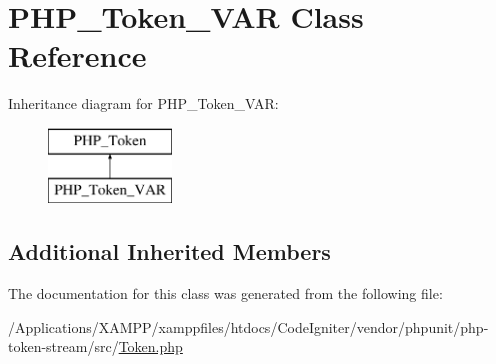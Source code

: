 \hypertarget{class_p_h_p___token___v_a_r}{}\section{P\+H\+P\+\_\+\+Token\+\_\+\+V\+AR Class Reference}
\label{class_p_h_p___token___v_a_r}
Inheritance diagram for P\+H\+P\+\_\+\+Token\+\_\+\+V\+AR\+:\begin{figure}[H]
\begin{center}
\leavevmode
\includegraphics[height=2.000000cm]{class_p_h_p___token___v_a_r}
\end{center}
\end{figure}
\subsection*{Additional Inherited Members}


The documentation for this class was generated from the following file\+:\begin{DoxyCompactItemize}
\item 
/\+Applications/\+X\+A\+M\+P\+P/xamppfiles/htdocs/\+Code\+Igniter/vendor/phpunit/php-\/token-\/stream/src/\mbox{\hyperlink{_token_8php}{Token.\+php}}\end{DoxyCompactItemize}
